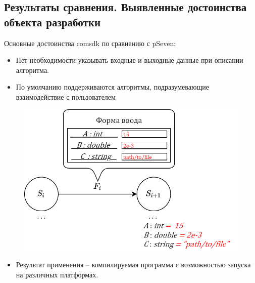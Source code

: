 \subsection{Результаты сравнения. Выявленные достоинства объекта разработки}
\begin{frame}
    Основные достоинства comsdk по сравнению с pSeven:
    \begin{itemize}
        \item Нет необходимости указывать входные и выходные данные при описании алгоритма.
        \item По умолчанию поддерживаются алгоритмы, подразумевающие взаимодействие с пользователем
    \end{itemize}

    \begin{figure}
        \centering
        \includegraphics[height=0.33\textheight]{images/illustration.form_generation.png}
    \end{figure}

    \begin{itemize}
        \item Результат применения -- компилируемая программа с возможностью запуска на различных платформах.
    \end{itemize}
\end{frame}

